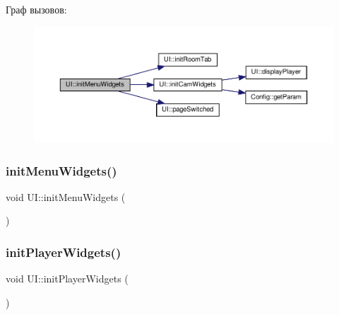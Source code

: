 Граф вызовов\+:\nopagebreak
\begin{figure}[H]
\begin{center}
\leavevmode
\includegraphics[width=350pt]{class_u_i_ac1d0ed7af2a3272527c544110fc37890_cgraph}
\end{center}
\end{figure}
\mbox{\label{class_u_i_ac1d0ed7af2a3272527c544110fc37890}} 
\subsubsection{\texorpdfstring{init\+Menu\+Widgets()}{initMenuWidgets()}\hspace{0.1cm}{\footnotesize\ttfamily [2/2]}}
{\footnotesize\ttfamily void U\+I\+::init\+Menu\+Widgets (\begin{DoxyParamCaption}{ }\end{DoxyParamCaption})\hspace{0.3cm}{\ttfamily [private]}}

\mbox{\label{class_u_i_a85a2b2c92c5d2017f50886f7a184ddd1}} 
\subsubsection{\texorpdfstring{init\+Player\+Widgets()}{initPlayerWidgets()}}
{\footnotesize\ttfamily void U\+I\+::init\+Player\+Widgets (\begin{DoxyParamCaption}{ }\end{DoxyParamCaption})\hspace{0.3cm}{\ttfamily [private]}}

